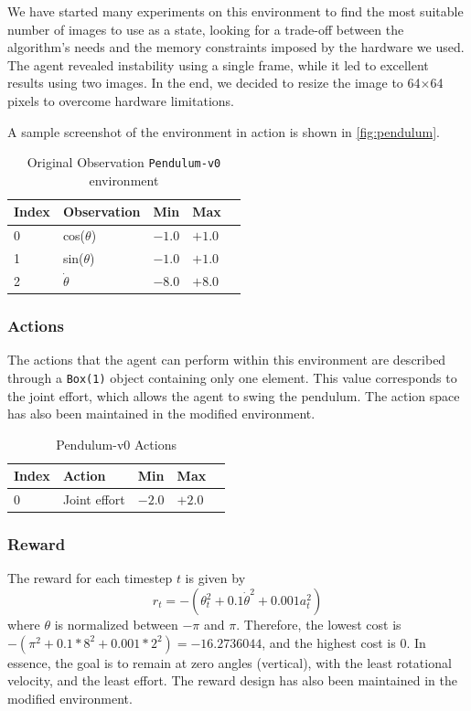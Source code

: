 We have started many experiments on this environment to find the most suitable number of images to use as a state, looking for a trade-off between the algorithm’s needs and the memory constraints imposed by the hardware we used.
The agent revealed instability using a single frame, while it led to excellent results using two images.
In the end, we decided to resize the image to 64$\times$64 pixels to overcome hardware limitations.

A sample screenshot of the environment in action is shown in \vref{fig:pendulum}.

\begin{table}[!h]
    \centering
    \caption{Original Observation \texttt{Pendulum-v0} environment}
    \label{table:pendulum_obs}
    \begin{tabular}{@{}lllll@{}}
        \toprule
        Index & Observation    & Min    & Max    \\ \midrule
        0     & cos($\theta$)  & $-1.0$ & $+1.0$ \\
        1     & sin($\theta$)  & $-1.0$ & $+1.0$ \\
        2     & $\dot{\theta}$ & $-8.0$ & $+8.0$ \\
        \bottomrule
    \end{tabular}
\end{table}

\subsubsection{Actions}

The actions that the agent can perform within this environment are described through a \texttt{Box(1)} object containing only one element.
This value corresponds to the joint effort, which allows the agent to swing the pendulum.
The action space has also been maintained in the modified environment.

\begin{table}[!h]
    \centering
    \caption{Pendulum-v0 Actions }
    \label{mountain_action}
    \begin{tabular}{@{}lllll@{}}
        \toprule
        Index & Action       & Min    & Max    \\ \midrule
        0     & Joint effort & $-2.0$ & $+2.0$ \\
        \bottomrule
    \end{tabular}
\end{table}

\subsubsection{Reward}
The reward for each timestep $t$ is given by \[r_t = -(\theta_t^2 + 0.1 \dot{\theta}^2 + 0.001 a_t^2)\]
where $\theta$ is normalized between $-\pi$ and $\pi$.
Therefore, the lowest cost is $-(\pi^2 + 0.1*8^2 + 0.001*2^2) = -16.2736044$, and the highest cost is $0$.
In essence, the goal is to remain at zero angles (vertical), with the least rotational velocity, and the least effort.
The reward design has also been maintained in the modified environment.

